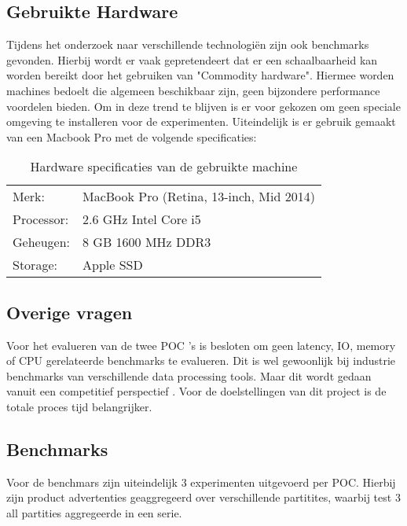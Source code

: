 \clearpage

\subsection{Gebruikte Hardware}
\label{subsec:hardware_specs}

Tijdens het onderzoek naar verschillende technologiën zijn ook benchmarks gevonden. Hierbij wordt er vaak gepretendeert dat er een schaalbaarheid kan worden bereikt door het gebruiken van "Commodity hardware". Hiermee worden machines bedoelt die algemeen beschikbaar zijn, geen bijzondere performance voordelen bieden. Om in deze trend te blijven is er voor gekozen om geen speciale omgeving te installeren voor de experimenten. Uiteindelijk is er gebruik gemaakt van een Macbook Pro met de volgende specificaties:

\begin{table}[h]
\caption{Hardware specificaties van de gebruikte machine}
\label{tab:hardware_specs}
\begin{tabular}{ll}
Merk:      & MacBook Pro (Retina, 13-inch, Mid 2014) \\
Processor: & 2.6 GHz Intel Core i5                   \\
Geheugen:  & 8 GB 1600 MHz DDR3                      \\
Storage:   & Apple SSD                                  
\end{tabular}
\end{table}

\subsection{Overige vragen}

Voor het evalueren van de twee POC 's is besloten om geen latency, IO, memory of CPU gerelateerde benchmarks te evalueren. Dit is wel gewoonlijk bij industrie benchmarks van verschillende data processing tools. Maar dit wordt gedaan vanuit een competitief perspectief  \parencite{ousterhout2015making}. Voor de doelstellingen van dit project is de totale proces tijd belangrijker.

\subsection{Benchmarks}

Voor de benchmars zijn uiteindelijk 3 experimenten uitgevoerd per POC. Hierbij zijn product advertenties geaggregeerd over verschillende partitites, waarbij test 3 all partities aggregeerde in een serie.

